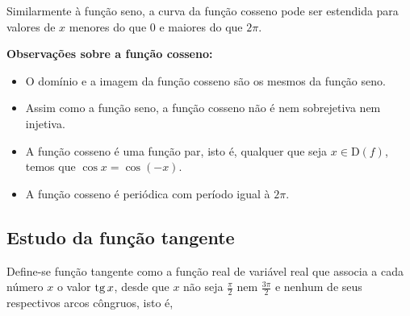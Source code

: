 \begin{center}
\end{center}


Similarmente à função seno, a curva da função cosseno pode ser estendida para valores de $x$ menores do que 0 e maiores do que $2 \pi$.

\textbf{Observações sobre a função cosseno:}
\begin{itemize}
   \item O domínio e a imagem da função cosseno são os mesmos da função seno.
    \item Assim como a função seno, a função cosseno não é nem sobrejetiva nem injetiva.
    \item A função cosseno é uma função par, isto é, qualquer que seja $x\in \text{D}(f)$, temos que $\cos x= \cos (-x)$.
    \item A função cosseno é periódica com período igual à $2\pi$.
\end{itemize}

\subsection{Estudo da função tangente}

Define-se função tangente como a função real de variável real que associa a cada número $x$ o valor $\operatorname{tg} x$, desde que $x$ não seja $\frac{\pi}{2}$ nem $\frac{3\pi}{2}$ e nenhum de seus respectivos arcos côngruos, isto é,

